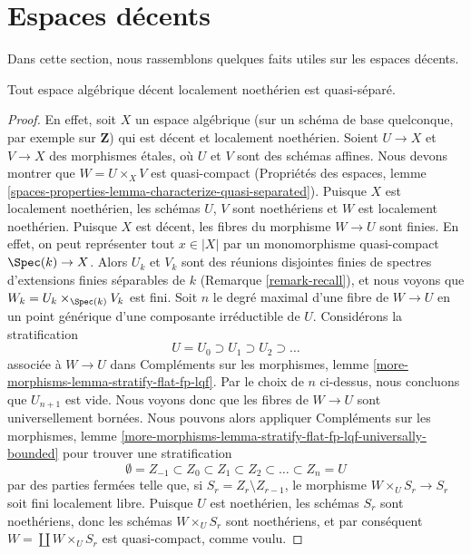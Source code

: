 \section{Espaces décents}
\label{section-decent}

\noindent
Dans cette section, nous rassemblons quelques faits utiles sur les espaces
décents.

\begin{lemma}
\label{lemma-locally-Noetherian-decent-quasi-separated}
Tout espace algébrique décent localement noethérien est quasi-séparé.
\end{lemma}

\begin{proof}
En effet, soit $X$ un espace algébrique (sur un schéma de base quelconque,
par exemple sur $\mathbf{Z}$) qui est décent et localement noethérien.
Soient $U \to X$ et $V \to X$ des morphismes étales, où $U$ et $V$ sont
des schémas affines. Nous devons montrer que $W = U \times_X V$ est
quasi-compact (Propriétés des espaces, lemme
\ref{spaces-properties-lemma-characterize-quasi-separated}).
Puisque $X$ est localement noethérien, les schémas $U$, $V$ sont noethériens
et $W$ est localement noethérien. Puisque $X$ est décent, les fibres du
morphisme $W \to U$ sont finies. En effet, on peut représenter tout
$x \in |X|$ par un monomorphisme quasi-compact $\Spec(k) \to X$.
Alors $U_k$ et $V_k$ sont des réunions disjointes finies de spectres
d'extensions finies séparables de $k$ (Remarque \ref{remark-recall}), et
nous voyons que $W_k = U_k \times_{\Spec(k)} V_k$ est fini.
Soit $n$ le degré maximal d'une fibre de $W \to U$ en un point générique
d'une composante irréductible de $U$. Considérons la stratification
$$
U = U_0 \supset U_1 \supset U_2 \supset \ldots
$$
associée à $W \to U$ dans
Compléments sur les morphismes, lemme \ref{more-morphisms-lemma-stratify-flat-fp-lqf}.
Par le choix de $n$ ci-dessus, nous concluons que $U_{n + 1}$ est vide.
Nous voyons donc que les fibres de $W \to U$ sont universellement bornées.
Nous pouvons alors appliquer Compléments sur les morphismes, lemme
\ref{more-morphisms-lemma-stratify-flat-fp-lqf-universally-bounded}
pour trouver une stratification
$$
\emptyset = Z_{-1} \subset Z_0 \subset Z_1 \subset Z_2 \subset
\ldots \subset Z_n = U
$$
par des parties fermées telle que, si $S_r = Z_r \setminus Z_{r - 1}$,
le morphisme $W \times_U S_r \to S_r$ soit fini localement libre.
Puisque $U$ est noethérien, les schémas $S_r$ sont noethériens, donc les
schémas $W \times_U S_r$ sont noethériens, et par conséquent
$W = \coprod W \times_U S_r$ est quasi-compact, comme voulu.
\end{proof}


